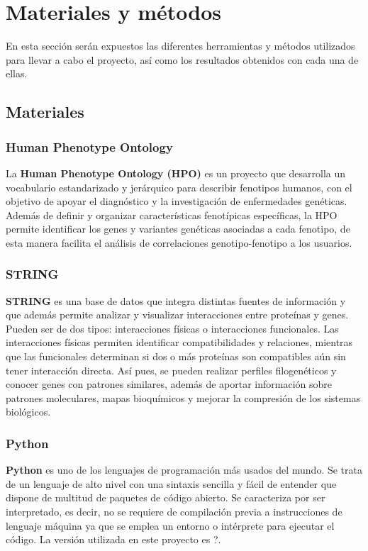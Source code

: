 \section{Materiales y métodos}

En esta sección serán expuestos las diferentes herramientas y métodos utilizados para llevar a cabo el proyecto, así como los resultados obtenidos con cada una de ellas.

\subsection{Materiales}
\subsubsection{Human Phenotype Ontology}

La \textbf{Human Phenotype Ontology (HPO)} es un proyecto que desarrolla un vocabulario estandarizado y jerárquico para describir fenotipos humanos, con el objetivo de apoyar el diagnóstico y la investigación de enfermedades genéticas. Además de definir y organizar características fenotípicas específicas, la HPO permite identificar los genes y variantes genéticas asociadas a cada fenotipo, de esta manera facilita el análisis de correlaciones genotipo-fenotipo a los usuarios.

\subsubsection{STRING}

\textbf{STRING} es una base de datos que integra distintas fuentes de información y que además permite analizar y visualizar interacciones entre proteínas y genes. Pueden ser de dos tipos: interacciones físicas o interacciones funcionales. Las interacciones físicas permiten identificar compatibilidades y relaciones, mientras que las funcionales determinan si dos o más proteínas son compatibles aún sin tener interacción directa. Así pues, se pueden realizar perfiles filogenéticos y conocer genes con patrones similares, además de aportar información sobre patrones moleculares, mapas bioquímicos y mejorar la compresión de los sistemas biológicos.

\subsubsection{Python}
\textbf{Python} es uno de los lenguajes de programación más usados del mundo. Se trata de un lenguaje de alto nivel con una sintaxis sencilla y fácil de entender que dispone de multitud de paquetes de código abierto. Se caracteriza por ser interpretado, es decir, no se requiere de compilación previa a instrucciones de lenguaje máquina ya que se emplea un entorno o intérprete para ejecutar el código. La versión utilizada en este proyecto es ?.

